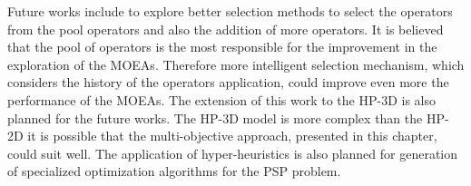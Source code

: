 Future works include to explore better selection methods to select the operators from the pool operators and also the addition of more operators. It is believed that the pool of operators is the most responsible for the improvement in the exploration of the MOEAs. Therefore more intelligent selection mechanism, which considers the history of the operators application, could improve even more the performance of the MOEAs. The extension of this work to the HP-3D is also planned for the future works. The HP-3D model is more complex than the HP-2D it is possible that the multi-objective approach, presented in this chapter, could suit well. The application of hyper-heuristics is also planned for generation of specialized optimization algorithms for the PSP problem. 

